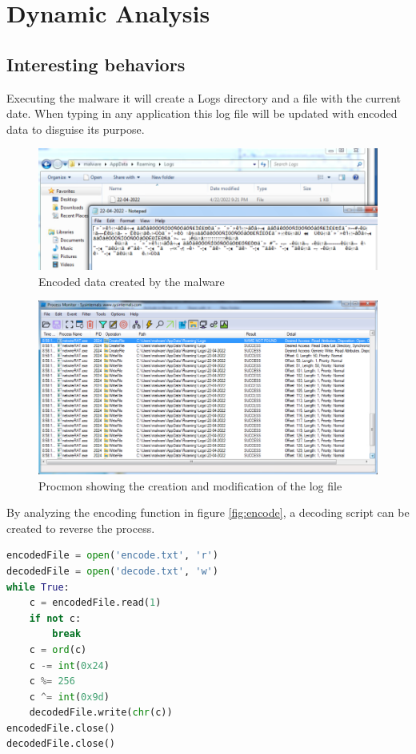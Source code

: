 \documentclass{article}
\begin{document}
    \section{Dynamic Analysis}
    \subsection{Interesting behaviors}
    Executing the malware it will create a Logs directory and a file with the current date. When typing in any application this log file will be updated with encoded data to disguise its purpose.
    \begin{figure}[H]
        \includegraphics[width=\textwidth]{encoded-logs.png}
        \caption{Encoded data created by the malware}
    \end{figure}
    \begin{figure}[H]
        \includegraphics[width=\textwidth]{procmon-logs.png}
        \caption{Procmon showing the creation and modification of the log file}
    \end{figure}
    \pagebreak
    By analyzing the encoding function in figure \ref{fig:encode}, a decoding script can be created to reverse the process.
    \begin{lstlisting}[language=Python]
encodedFile = open('encode.txt', 'r')
decodedFile = open('decode.txt', 'w')
while True:
    c = encodedFile.read(1)
    if not c:
        break
    c = ord(c)
    c -= int(0x24)
    c %= 256
    c ^= int(0x9d)
    decodedFile.write(chr(c))
encodedFile.close()
decodedFile.close()
    \end{lstlisting}
\end{document}
